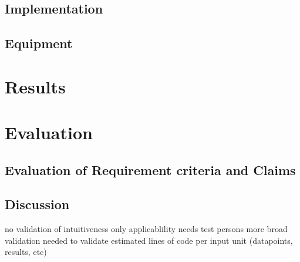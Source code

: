 \subsection{Implementation}
\subsection{Equipment}
\section{Results}
\section{Evaluation}
\subsection{Evaluation of Requirement criteria and Claims}
\subsection{Discussion}
no validation of intuitiveness 
	only applicablility
	needs test persons
more broad validation needed
	to validate estimated lines of code per input unit (datapoints, results, etc)